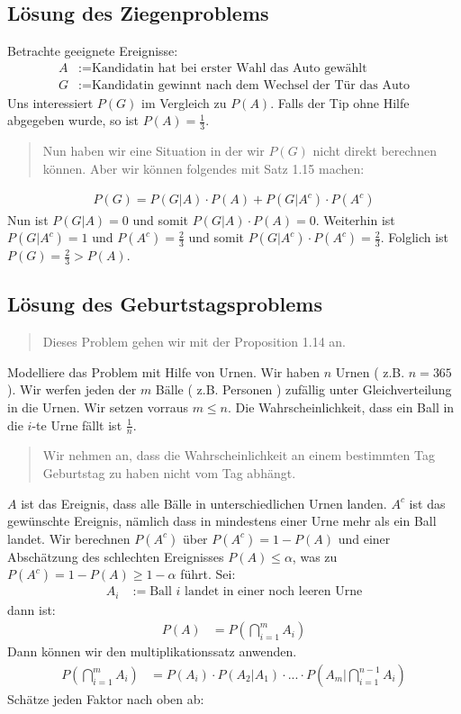 \subsection{Lösung des Ziegenproblems}
Betrachte geeignete Ereignisse:
\begin{align*}
A &:= \text{Kandidatin hat bei erster Wahl das Auto gewählt} \\ %
G &:= \text{Kandidatin gewinnt nach dem Wechsel der Tür das Auto}
\end{align*}
Uns interessiert $P(G)$ im Vergleich zu $P(A)$. Falls der Tip ohne Hilfe abgegeben wurde, so ist $P(A)=\frac{1}{3}$.
\begin{quote}
Nun haben wir eine Situation in der wir $P(G)$ nicht direkt berechnen können. Aber wir können folgendes mit Satz 1.15 machen:\end{quote}
\begin{align*}
P(G)=P(G|A)\cdot P(A) + P(G|A^c)\cdot P(A^c)
\end{align*}
Nun ist $P(G|A)=0$ und somit $P(G|A)\cdot P(A) = 0$. Weiterhin ist $P(G|A^c)=1$ und $P(A^c)=\frac{2}{3}$ und somit %
$P(G|A^c)\cdot P(A^c) = \frac{2}{3}$. Folglich ist $P(G) = \frac{2}{3} > P(A)$.

\subsection{Lösung des Geburtstagsproblems}
\begin{quote}
Dieses Problem gehen wir mit der Proposition 1.14 an.
\end{quote}
Modelliere das Problem mit Hilfe von Urnen. Wir haben $n$ Urnen ( z.B. $n = 365$ ). Wir werfen jeden der $m$ Bälle ( z.B. %
Personen ) zufällig unter Gleichverteilung in die Urnen. Wir setzen vorraus $m \leq n$. Die Wahrscheinlichkeit, dass ein %
Ball in die $i$-te Urne fällt ist $\frac{1}{n}$.
\begin{quote}
Wir nehmen an, dass die Wahrscheinlichkeit an einem bestimmten Tag Geburtstag zu haben nicht vom Tag abhängt.
\end{quote}
$A$ ist das Ereignis, dass alle Bälle in unterschiedlichen Urnen landen. $A^c$ ist das gewünschte Ereignis, nämlich %
dass in mindestens einer Urne mehr als ein Ball landet.
Wir berechnen $P(A^c)$ über $P(A^c)=1-P(A)$ und einer Abschätzung des schlechten Ereignisses $P(A) \leq \alpha$, was zu %
$P(A^c) = 1-P(A) \geq 1-\alpha$ führt.
Sei:
\begin{align*}
A_i &:= \text{Ball } i \text{ landet in einer noch leeren Urne}
\end{align*}
dann ist:
\begin{align*}
P(A) &= P \left ( \bigcap\limits_{i=1}^m A_i \right )
\end{align*}
Dann können wir den multiplikationssatz anwenden.
\begin{align*}
P \left ( \bigcap\limits_{i=1}^m A_i \right ) &= P(A_i) \cdot P(A_2|A_1) \cdot ... \cdot P(A_m|\bigcap\limits_{i=1}^{n-1} A_i )
\end{align*}
Schätze jeden Faktor nach oben ab:

